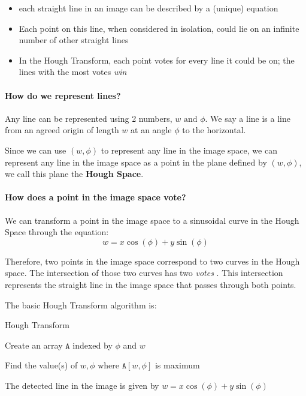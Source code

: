 \documentclass{article}
\begin{document}
\begin{itemize}
  \item each straight line in an image can be described by a (unique) equation
  \item Each point on this line, when considered in isolation, could lie on an infinite number of other straight lines
  \item In the Hough Transform, each point votes for every line it could be on; the lines with the most votes \textit{win}
\end{itemize}

\paragraph{How do we represent lines?}

Any line can be represented using 2 numbers, $w \text{ and } \phi$. We say a line is a line from an agreed origin of length $w$ at an angle $\phi$ to the horizontal.

Since we can use $(w,\phi)$ to represent any line in the image space, we can represent any line in the image space as a point in the plane defined by $(w,\phi)$, we call this plane the \textbf{Hough Space}.

\paragraph{How does a point in the image space vote?}

We can transform a point in the image space to a sinusoidal curve in the Hough Space through the equation:
\[
  w = x \cos(\phi) + y \sin(\phi)
\]

Therefore, two points in the image space correspond to two curves in the Hough space. The intersection of those two curves has two \textit{votes} . This intersection represents the straight line in the image space that passes through both points.

The basic Hough Transform algorithm is:

\begin{algorithm}
  \caption{Hough Transform}
  Create an array $\texttt{A} $ indexed by $\phi$ and $w$


  Find the value(s) of $w,\phi$ where $\texttt{A}[w,\phi] $ is maximum

  The detected line in the image is given by $w = x\cos(\phi) + y\sin(\phi)$
\end{algorithm}
\end{document}

